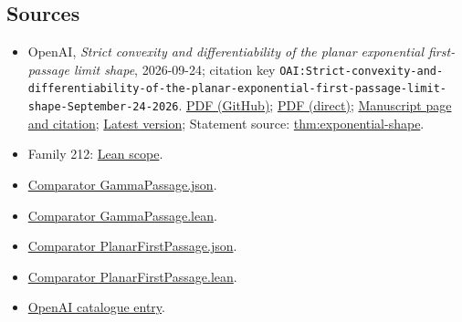 \documentclass[11pt]{article}
\begin{document}
\subsection{Sources}
\begin{itemize}
\item OpenAI, \emph{Strict convexity and differentiability of the planar exponential first-passage limit shape}, 2026-09-24; citation key \texttt{OAI:Strict-convexity-and-differentiability-of-the-planar-exponential-first-passage-limit-shape-September-24-2026}. \href{https://github.com/openai/math/blob/adc7f1241b42e322a6451854ab7e4b4c146bf78a/preprints/Strict-convexity-and-differentiability-of-the-planar-exponential-first-passage-limit-shape-September-24-2026/main.pdf}{PDF (GitHub)}; \href{https://github.com/openai/math/raw/adc7f1241b42e322a6451854ab7e4b4c146bf78a/preprints/Strict-convexity-and-differentiability-of-the-planar-exponential-first-passage-limit-shape-September-24-2026/main.pdf}{PDF (direct)}; \href{https://github.com/openai/math/blob/adc7f1241b42e322a6451854ab7e4b4c146bf78a/preprints/Strict-convexity-and-differentiability-of-the-planar-exponential-first-passage-limit-shape-September-24-2026/README.md}{Manuscript page and citation}; \href{https://github.com/openai/math/blob/main/preprints/Strict-convexity-and-differentiability-of-the-planar-exponential-first-passage-limit-shape-September-24-2026/main.pdf}{Latest version}; Statement source: \href{https://github.com/openai/math/blob/adc7f1241b42e322a6451854ab7e4b4c146bf78a/preprints/Strict-convexity-and-differentiability-of-the-planar-exponential-first-passage-limit-shape-September-24-2026/build/sections/introduction.tex\#L21}{thm:exponential-shape}.
\item Family 212: \href{https://github.com/openai/math/blob/adc7f1241b42e322a6451854ab7e4b4c146bf78a/lean/docs/212.md}{Lean scope}.
\item \href{https://github.com/openai/math/blob/adc7f1241b42e322a6451854ab7e4b4c146bf78a/lean/ComparatorChallenges/GammaPassage.json}{Comparator GammaPassage.json}.
\item \href{https://github.com/openai/math/blob/adc7f1241b42e322a6451854ab7e4b4c146bf78a/lean/ComparatorChallenges/GammaPassage.lean}{Comparator GammaPassage.lean}.
\item \href{https://github.com/openai/math/blob/adc7f1241b42e322a6451854ab7e4b4c146bf78a/lean/ComparatorChallenges/PlanarFirstPassage.json}{Comparator PlanarFirstPassage.json}.
\item \href{https://github.com/openai/math/blob/adc7f1241b42e322a6451854ab7e4b4c146bf78a/lean/ComparatorChallenges/PlanarFirstPassage.lean}{Comparator PlanarFirstPassage.lean}.
\item \href{https://github.com/openai/math/blob/adc7f1241b42e322a6451854ab7e4b4c146bf78a/CONTENTS.md}{OpenAI catalogue entry}.
\end{itemize}
\end{document}
